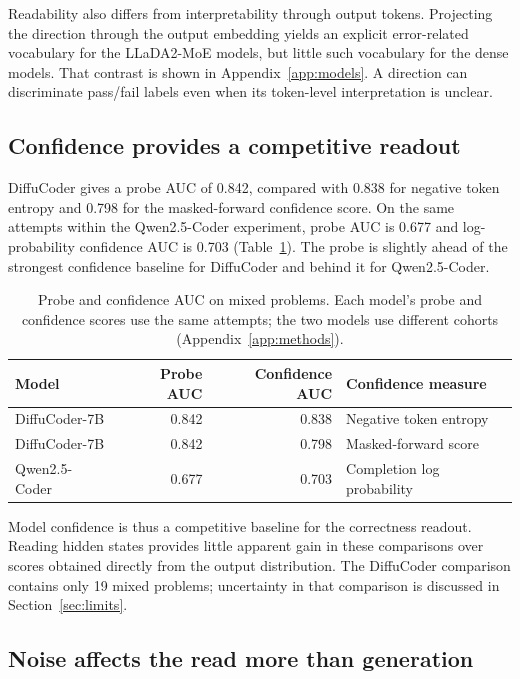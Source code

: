 \documentclass[11pt,letterpaper]{article}
\begin{document}
Readability also differs from interpretability through output tokens. Projecting the direction through the output embedding yields an explicit error-related vocabulary for the LLaDA2-MoE models, but little such vocabulary for the dense models. That contrast is shown in Appendix~\ref{app:models}. A direction can discriminate pass/fail labels even when its token-level interpretation is unclear.

\subsection{Confidence provides a competitive readout}

DiffuCoder gives a probe AUC of 0.842, compared with 0.838 for negative token entropy and 0.798 for the masked-forward confidence score. On the same attempts within the Qwen2.5-Coder experiment, probe AUC is 0.677 and log-probability confidence AUC is 0.703 (Table~\ref{tab:confidence}). The probe is slightly ahead of the strongest confidence baseline for DiffuCoder and behind it for Qwen2.5-Coder.

\begin{table}[htbp]
\centering\small
\caption{Probe and confidence AUC on mixed problems. Each model's probe and confidence scores use the same attempts; the two models use different cohorts (Appendix~\ref{app:methods}).}
\label{tab:confidence}
\begin{tabular}{@{}lrrl@{}}
\toprule
Model & Probe AUC & Confidence AUC & Confidence measure\\
\midrule
DiffuCoder-7B & 0.842 & 0.838 & Negative token entropy\\
DiffuCoder-7B & 0.842 & 0.798 & Masked-forward score\\
Qwen2.5-Coder & 0.677 & 0.703 & Completion log probability\\
\bottomrule
\end{tabular}
\end{table}

Model confidence is thus a competitive baseline for the correctness readout. Reading hidden states provides little apparent gain in these comparisons over scores obtained directly from the output distribution. The DiffuCoder comparison contains only 19 mixed problems; uncertainty in that comparison is discussed in Section~\ref{sec:limits}.

\subsection{Noise affects the read more than generation}
\end{document}
